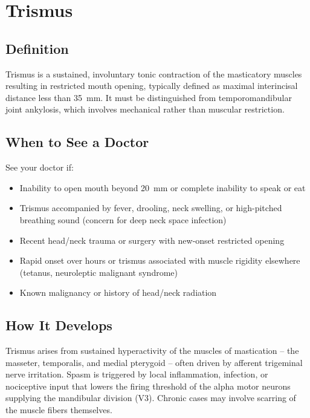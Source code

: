 \chapter{Trismus}

\section*{Definition}
Trismus is a sustained, involuntary tonic contraction of the masticatory muscles resulting in restricted mouth opening, typically defined as maximal interincisal distance less than 35~mm. It must be distinguished from temporomandibular joint ankylosis, which involves mechanical rather than muscular restriction.

\section*{When to See a Doctor}
See your doctor if:
\begin{itemize}
  \item Inability to open mouth beyond 20~mm or complete inability to speak or eat
  \item Trismus accompanied by fever, drooling, neck swelling, or high-pitched breathing sound (concern for deep neck space infection)
  \item Recent head/neck trauma or surgery with new-onset restricted opening
  \item Rapid onset over hours or trismus associated with muscle rigidity elsewhere (tetanus, neuroleptic malignant syndrome)
  \item Known malignancy or history of head/neck radiation
\end{itemize}

\section*{How It Develops}
Trismus arises from sustained hyperactivity of the muscles of mastication -- the masseter, temporalis, and medial pterygoid -- often driven by afferent trigeminal nerve irritation. Spasm is triggered by local inflammation, infection, or nociceptive input that lowers the firing threshold of the alpha motor neurons supplying the mandibular division (V3). Chronic cases may involve scarring of the muscle fibers themselves.

